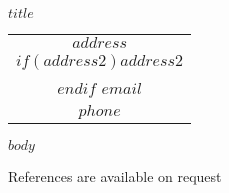 \documentclass[11pt, a4paper]{article}
\begin{document}
\begin{center}
\titlefont $title$
\end{center}
\begin{center}
\large
\begin{tabular}[t]{c}
$address$\\$if(address2)$$address2$\\$endif$
$email$\\
$phone$
\end{tabular}\par\end{center}
\vspace{0.25em}
\vspace{-2em}
\recomputelengths
$body$
 
\vfill

References are available on request
\end{document}
